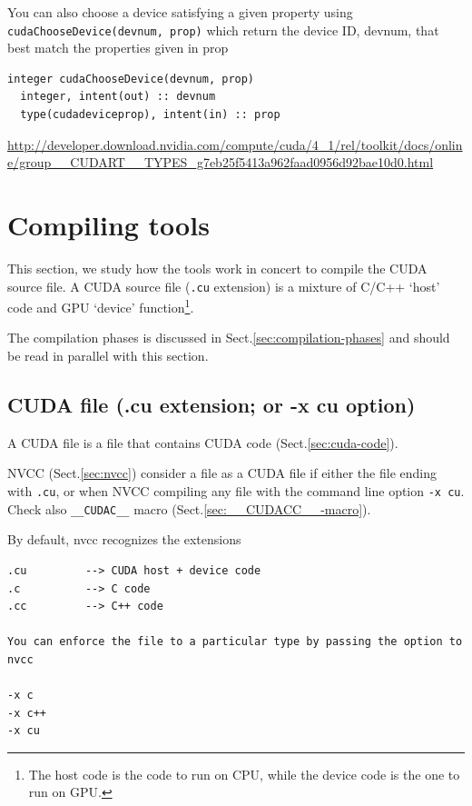 You can also choose a device satisfying a given property using
\verb.cudaChooseDevice(devnum, prop). which return the device ID,
devnum, that best match the properties given in prop
\begin{lstlisting}
integer cudaChooseDevice(devnum, prop)
  integer, intent(out) :: devnum
  type(cudadeviceprop), intent(in) :: prop
\end{lstlisting}
\url{http://developer.download.nvidia.com/compute/cuda/4_1/rel/toolkit/docs/online/group__CUDART__TYPES_g7eb25f5413a962faad0956d92bae10d0.html}



\section{Compiling tools}
\label{sec:compile-tools-CUDA}
\label{sec:cuda-compilation-howto}

This section, we study how the tools work in concert to compile the CUDA source
file. A CUDA source file (\verb!.cu! extension) is a mixture of C/C++ `host'
code and GPU `device' function\footnote{The host code is the code to run on CPU,
while the device code is the one to run on GPU.}.

The compilation phases is discussed in Sect.\ref{sec:compilation-phases} and
should be read in parallel with this section.
  
\subsection{CUDA file (.cu extension; or -x cu option)}
\label{sec:CUDA-file-definition}

A CUDA file is a file that contains CUDA code (Sect.\ref{sec:cuda-code}).

NVCC (Sect.\ref{sec:nvcc}) consider a file as a CUDA file  if either the file
ending with \verb!.cu!, or when NVCC compiling any file with the command line
option \verb!-x cu!.
Check also \verb!__CUDAC__! macro (Sect.\ref{sec:__CUDACC__-macro}).

By default, nvcc recognizes the extensions
\begin{verbatim}
.cu         --> CUDA host + device code
.c          --> C code
.cc         --> C++ code

You can enforce the file to a particular type by passing the option to nvcc

-x c
-x c++
-x cu
\end{verbatim}

